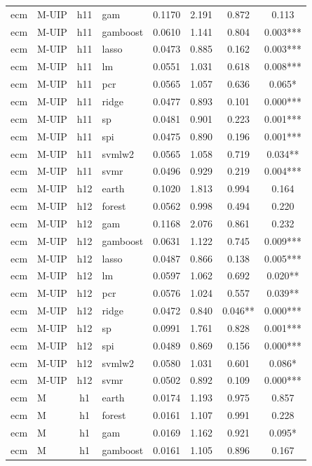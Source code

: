 \begin{ThreePartTable}
\begin{longtable}[t]{llclcccc}
ecm & M-UIP & h11 & gam & 0.1170 & 2.191 & 0.872 & 0.113\\
ecm & M-UIP & h11 & gamboost & 0.0610 & 1.141 & 0.804 & 0.003***\\
ecm & M-UIP & h11 & lasso & 0.0473 & 0.885 & 0.162 & 0.003***\\
ecm & M-UIP & h11 & lm & 0.0551 & 1.031 & 0.618 & 0.008***\\
ecm & M-UIP & h11 & pcr & 0.0565 & 1.057 & 0.636 & 0.065*\\
ecm & M-UIP & h11 & ridge & 0.0477 & 0.893 & 0.101 & 0.000***\\
ecm & M-UIP & h11 & sp & 0.0481 & 0.901 & 0.223 & 0.001***\\
ecm & M-UIP & h11 & spi & 0.0475 & 0.890 & 0.196 & 0.001***\\
ecm & M-UIP & h11 & svmlw2 & 0.0565 & 1.058 & 0.719 & 0.034**\\
ecm & M-UIP & h11 & svmr & 0.0496 & 0.929 & 0.219 & 0.004***\\
\addlinespace
ecm & M-UIP & h12 & earth & 0.1020 & 1.813 & 0.994 & 0.164\\
ecm & M-UIP & h12 & forest & 0.0562 & 0.998 & 0.494 & 0.220\\
ecm & M-UIP & h12 & gam & 0.1168 & 2.076 & 0.861 & 0.232\\
ecm & M-UIP & h12 & gamboost & 0.0631 & 1.122 & 0.745 & 0.009***\\
ecm & M-UIP & h12 & lasso & 0.0487 & 0.866 & 0.138 & 0.005***\\
ecm & M-UIP & h12 & lm & 0.0597 & 1.062 & 0.692 & 0.020**\\
ecm & M-UIP & h12 & pcr & 0.0576 & 1.024 & 0.557 & 0.039**\\
ecm & M-UIP & h12 & ridge & 0.0472 & 0.840 & 0.046** & 0.000***\\
ecm & M-UIP & h12 & sp & 0.0991 & 1.761 & 0.828 & 0.001***\\
ecm & M-UIP & h12 & spi & 0.0489 & 0.869 & 0.156 & 0.000***\\
ecm & M-UIP & h12 & svmlw2 & 0.0580 & 1.031 & 0.601 & 0.086*\\
ecm & M-UIP & h12 & svmr & 0.0502 & 0.892 & 0.109 & 0.000***\\
\addlinespace
ecm & M & h1 & earth & 0.0174 & 1.193 & 0.975 & 0.857\\
ecm & M & h1 & forest & 0.0161 & 1.107 & 0.991 & 0.228\\
ecm & M & h1 & gam & 0.0169 & 1.162 & 0.921 & 0.095*\\
ecm & M & h1 & gamboost & 0.0161 & 1.105 & 0.896 & 0.167\\

\end{longtable}
\end{ThreePartTable}
